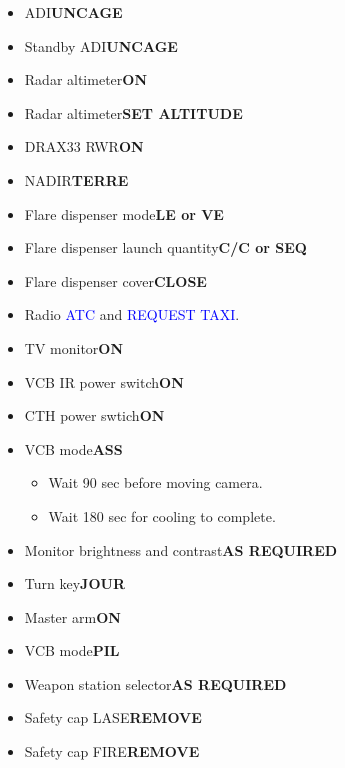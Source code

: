\documentclass[a4paper,12pt,dvipsnames]{letter}
\newcommand{\radio}[1]{\textcolor{blue}{#1}}
\newcommand{\button}[1]{\textbf{#1}}
\begin{document}
{\newpage
\begin{itemize} 
 \item ADI\dotfill\button{UNCAGE}
 \item Standby ADI\dotfill\button{UNCAGE} 
 \item Radar altimeter\dotfill\button{ON}
 \item Radar altimeter\dotfill\button{SET ALTITUDE}
 \item DRAX33 RWR\dotfill\button{ON}
 \item NADIR\dotfill\button{TERRE}
 \item Flare dispenser mode\dotfill\button{LE or VE}
 \item Flare dispenser launch quantity\dotfill\button{C/C or SEQ}
 \item Flare dispenser cover\dotfill\button{CLOSE}
 \item Radio \radio{ATC} and \radio{REQUEST TAXI}.
\end{itemize}
\newpage
\begin{itemize} 
 \item TV monitor\dotfill\button{ON}
 \item VCB IR power switch\dotfill\button{ON}
 \item CTH power swtich\dotfill\button{ON}
 \item VCB mode\dotfill\button{ASS}
 \begin{itemize}
  \item Wait 90 sec before moving camera.
  \item Wait 180 sec for cooling to complete.
 \end{itemize}
 \item Monitor brightness and contrast\dotfill\button{AS REQUIRED}
 \item Turn key\dotfill\button{JOUR}
 \item Master arm\dotfill\button{ON}
 \item VCB mode\dotfill\button{PIL}
 \item Weapon station selector\dotfill\button{AS REQUIRED}
 \item Safety cap LASE\dotfill\button{REMOVE}
 \item Safety cap FIRE\dotfill\button{REMOVE}  
\end{itemize}
}
\end{document}
